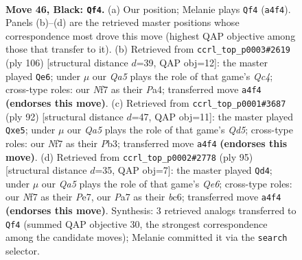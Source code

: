\documentclass[11pt]{article}
\begin{document}
\clearpage

\begin{figure}[p]\centering
\begin{subfigure}{0.46\textwidth}\centering
\resizebox{\linewidth}{!}{%
\newchessgame
\chessboard[
  setfen={1k6/p1p2npp/1p2Q3/2p3P1/q7/2P5/1P6/1K6 b - - 8 46},
  showmover=false,
  pgfstyle=straightmove, color=movearrow, markmove={a4-f4}
]}
\caption{}
\end{subfigure}\hfill
\begin{subfigure}{0.46\textwidth}\centering
\resizebox{\linewidth}{!}{%
\newchessgame
\chessboard[
  setfen={5k2/6p1/1p4p1/q7/P1Q3Pp/1P5P/5PK1/8 w - - 7 54},
  showmover=false,
  pgfstyle=straightmove, color=movearrow, markmove={c4-e6}
]}
\caption{}
\end{subfigure}
\\[4pt]
\begin{subfigure}{0.46\textwidth}\centering
\resizebox{\linewidth}{!}{%
\newchessgame
\chessboard[
  setfen={8/6pk/1p6/3Qp2p/4P3/1P2PKP1/2q4P/8 w - - 0 47},
  showmover=false,
  pgfstyle=straightmove, color=movearrow, markmove={d5-e5}
]}
\caption{}
\end{subfigure}\hfill
\begin{subfigure}{0.46\textwidth}\centering
\resizebox{\linewidth}{!}{%
\newchessgame
\chessboard[
  setfen={8/4ppk1/2Bp2p1/2p4p/2P4P/4q1P1/7K/5Q2 b - - 5 48},
  showmover=false,
  pgfstyle=straightmove, color=movearrow, markmove={e3-d4}
]}
\caption{}
\end{subfigure}
\caption{\textbf{Move 46, Black: \texttt{Qf4}.} (a) Our position; Melanie plays \texttt{Qf4} (\texttt{a4f4}). Panels (b)--(d) are the retrieved master positions whose correspondence most drove this move (highest QAP objective among those that transfer to it). (b) Retrieved from \texttt{ccrl\_top\_p0003\#2619} (ply 106) [structural distance $d$=39, QAP obj=12]: the master played \texttt{Qe6}; under $\mu$ our \emph{Qa5} plays the role of that game's \emph{Qc4}; cross-type roles: our \emph{N}f7 as their \emph{P}a4; transferred move \texttt{a4f4} \textbf{(endorses this move)}. (c) Retrieved from \texttt{ccrl\_top\_p0001\#3687} (ply 92) [structural distance $d$=47, QAP obj=11]: the master played \texttt{Qxe5}; under $\mu$ our \emph{Qa5} plays the role of that game's \emph{Qd5}; cross-type roles: our \emph{N}f7 as their \emph{P}b3; transferred move \texttt{a4f4} \textbf{(endorses this move)}. (d) Retrieved from \texttt{ccrl\_top\_p0002\#2778} (ply 95) [structural distance $d$=35, QAP obj=7]: the master played \texttt{Qd4}; under $\mu$ our \emph{Qa5} plays the role of that game's \emph{Qe6}; cross-type roles: our \emph{N}f7 as their \emph{P}e7, our \emph{P}a7 as their \emph{b}c6; transferred move \texttt{a4f4} \textbf{(endorses this move)}. Synthesis: 3 retrieved analogs transferred to \texttt{Qf4} (summed QAP objective 30, the strongest correspondence among the candidate moves); Melanie committed it via the \texttt{search} selector.}
\label{fig:thought-m91}
\end{figure}
\end{document}
